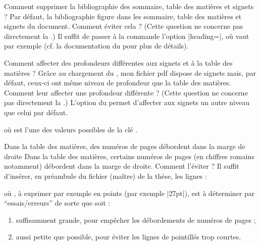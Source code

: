 \begin{dbfaq}{Comment supprimer la bibliographie des sommaire, table des
    matières et signets ?}{}
  Par défaut, la bibliographie figure dans les sommaire, table des matières et
  signets du document. Comment éviter cela ?
  \tcblower
  (Cette question ne concerne pas directement la \yatCl{}.) Il suffit de passer
  à la commande  l'option
  |heading=|, où  vaut par exemple
   (cf. la documentation du  pour plus
  de détails).
\end{dbfaq}

\begin{dbfaq}{Comment affecter des profondeurs différentes aux signets et à la
    table des matières ?}{}
  Grâce au chargement du , mon fichier \acrshort{pdf} dispose
  de signets mais, par défaut, ceux-ci ont même niveau de profondeur que la
  table des matières. Comment leur affecter une profondeur différente ?
  \tcblower
  (Cette question ne concerne pas directement la \yatCl{}.) L'option
   du  permet d'affecter aux signets un
  autre niveau que celui par défaut.
\begin{preamblecode}[title=Par exemple dans le \File{\configurationfile}]
\end{preamblecode}
où  est l'une des valeurs possibles de la clé
.
\end{dbfaq}

\begin{dbfaq}{Dans la table des matières, des numéros de pages débordent dans
    la marge de droite}{}
  Dans la table des matières, certains numéros de pages (en chiffres romains
  notamment) débordent dans la marge de droite. Comment l'éviter ?
  \tcblower
  Il suffit d'insérer, en préambule du fichier (maître) de la thèse, les
  lignes :
\begin{preamblecode}[title=Par exemple dans le \File{\configurationfile}]
\makeatletter
\renewcommand*\@pnumwidth{"\meta{distance}"}
\makeatother
\end{preamblecode}
  où , à exprimer par exemple en points (par exemple |27pt|),
  est à déterminer par \enquote{essais/erreurs} de sorte que 
  soit :
  \begin{enumerate}
  \item suffisamment grande, pour empêcher les débordements de numéros de
    pages ;
  \item aussi petite que possible, pour éviter les lignes de pointillés trop
    courtes.
  \end{enumerate}
\end{dbfaq}

